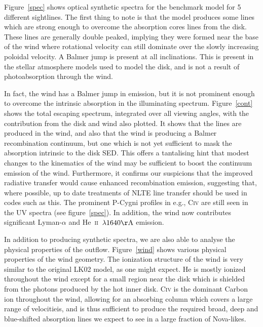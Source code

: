 \documentclass[preprint, a4paper, 11pt]{aastex}
\begin{document}
Figure~\ref{spec} shows optical synthetic spectra for the benchmark 
model for 5 different sightlines. The first thing to note is that the 
model produces some lines which are strong enough to overcome
the absorption cores lines from the disk. These lines are generally double peaked, 
implying they were formed near the base of the wind where rotational velocity
can still dominate over the slowly increasing poloidal velocity. A Balmer 
jump is present at all inclinations. This is present
in the stellar atmosphere models used to model the disk,
and is not a result of photoabsorption through the wind.

In fact, the wind has a Balmer jump in emission, but it is not prominent enough
to overcome the intrinsic absorption in the illuminating spectrum. 
Figure~\ref{cont} shows the total escaping spectrum, integrated
over all viewing angles, with the contribution from the disk and wind
also plotted. It shows that the lines are produced in the wind,
and also that the wind is producing a Balmer recombination
continuum, but one which is not yet sufficient to mask the absorption 
intrinsic to the disk SED. This offers a tantalising hint
that modest changes to the kinematics of the wind
may be sufficient to boost the continuum emission of the wind.
Furthermore, it confirms our suspicions that the improved
radiative transfer would cause enhanced recombination emission,
suggesting that, where possible, up to date treatments of
NLTE line transfer should be used in codes such as this.
The prominent P-Cygni profiles in e.g., C\textsc{iv} are still seen
in the UV spectra (see figure~\ref{spec}). In addition, the wind 
now contributes significant Lyman-$\alpha$ and
He~\textsc{ii}~$\lambda1640{\rm \AA}$  emission. 

In addition to producing synthetic spectra, we are also able to 
analyse the physical properties of the outflow.
Figure~\ref{wind} shows various physical properties
of the wind geometry. The ionization structure of the wind
is very similar to the original LK02 model, as one might expect.
He is mostly ionized throughout the wind except for a small region near
the disk which is shielded from the photons produced by the hot inner disk.
C\textsc{iv} is the dominant Carbon ion throughout the wind, allowing
for an absorbing column which covers a large range of velocitieis, and is thus
sufficient to produce the required broad, deep and blue-shifted absorption lines
we expect to see in a large fraction of Nova-likes.
\end{document}
